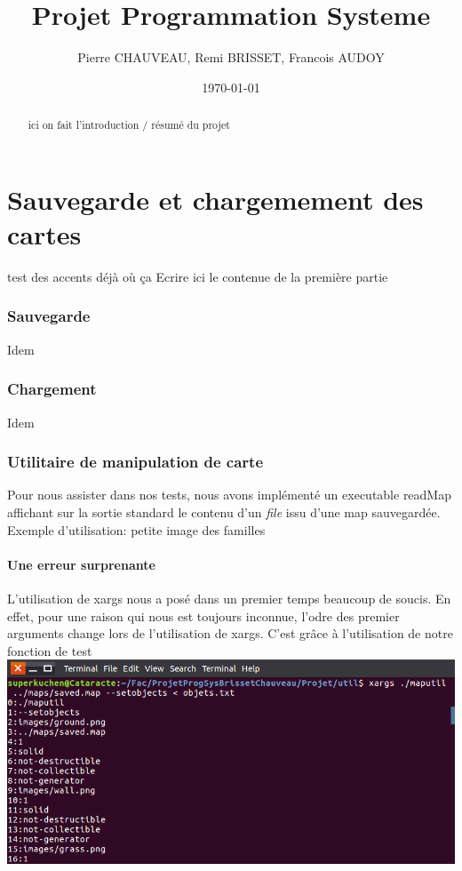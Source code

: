 \documentclass[a4paper]{article}
\title{Projet Programmation Systeme}
\author{Pierre CHAUVEAU, Remi BRISSET, Francois AUDOY}
\date{\today} %
\begin{document}
\maketitle


\begin{abstract}
  ici on fait l'introduction / résumé du projet
\end {abstract}

\part{Sauvegarde et chargemement des cartes}

test des accents déjà où ça
Ecrire ici le contenue de la première partie
\section{Sauvegarde}
Idem

\section{Chargement}
Idem

\section{Utilitaire de manipulation de carte}
Pour nous assister dans nos tests, nous avons implémenté un executable readMap affichant sur la sortie standard le contenu d'un \emph{file} issu d'une map sauvegardée.
Exemple d'utilisation:
petite image des familles 

\subsection{Une erreur surprenante}
L'utilisation de xargs nous a posé dans un premier temps beaucoup de soucis. En effet, pour une raison qui nous est toujours inconnue, l'odre des premier arguments change lors de l'utilisation de xargs. C'est grâce à l'utilisation de notre fonction de test %
\\
\includegraphics[scale=0.5]{erreurArgs.png}
\end{document}
